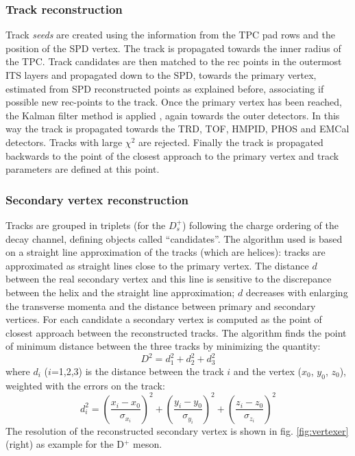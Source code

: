 \subsubsection{Track reconstruction}
Track \textit{seeds} are created using the information from the TPC pad rows and the position of the SPD vertex. The track is propagated towards the inner radius of the TPC. Track candidates are then matched to the rec points in the outermost ITS layers and propagated down to the SPD, towards the primary vertex, estimated from SPD reconstructed points as
explained before, associating if possible new rec-points to the track. Once the primary vertex has been reached, the Kalman filter method is applied \cite{kalman}, again towards the outer detectors. In this way the track is propagated towards the TRD, TOF, HMPID, PHOS and EMCal detectors. Tracks with large $\chi^2$ are rejected. Finally the track is propagated backwards to the point of the closest approach to the primary vertex and track parameters are defined at this point.

\subsubsection{Secondary vertex reconstruction}
Tracks are grouped in triplets (for the $D^+_s$) following the charge ordering of the decay channel, defining objects called ``candidates''. The algorithm used is based on a straight line approximation of the tracks (which are helices): tracks are approximated as straight lines close to the primary vertex. The distance $d$ between the real secondary vertex and this line is sensitive to the discrepance between the helix and the straight line approximation; $d$ decreases with enlarging the transverse momenta and the distance between primary and secondary vertices. For each candidate a secondary vertex is computed as the point of closest approach between the reconstructed tracks. The algorithm finds the point of minimum distance between the three tracks by minimizing the quantity:
\begin{equation}
D^2=d^2_1+d^2_2+d^2_3
\end{equation}
where $d_i$ ($i$=1,2,3) is the distance between the track $i$ and the vertex ($x_0$, $y_0$, $z_0$), weighted with the errors on the track:
\begin{equation}
d^2_i=\left(\frac{x_i-x_0}{\sigma_{x_i}}\right)^2+
\left(\frac{y_i-y_0}{\sigma_{y_i}}\right)^2+\left(\frac{z_i-z_0}{\sigma_{z_i}}\right)^2\end{equation}
The resolution of the reconstructed secondary vertex is shown in fig. \ref{fig:vertexer} (right) as example for  the D$^+$ meson.
